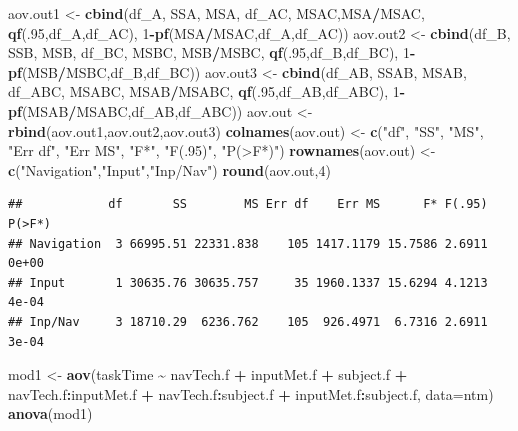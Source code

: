 \documentclass[
]{book}
\newenvironment{Shaded}{\begin{snugshade}}{\end{snugshade}}
\newcommand{\AttributeTok}[1]{\textcolor[rgb]{0.13,0.29,0.53}{#1}}
\newcommand{\DecValTok}[1]{\textcolor[rgb]{0.00,0.00,0.81}{#1}}
\newcommand{\FunctionTok}[1]{\textcolor[rgb]{0.13,0.29,0.53}{\textbf{#1}}}
\newcommand{\NormalTok}[1]{#1}
\newcommand{\OtherTok}[1]{\textcolor[rgb]{0.56,0.35,0.01}{#1}}
\newcommand{\SpecialCharTok}[1]{\textcolor[rgb]{0.81,0.36,0.00}{\textbf{#1}}}
\newcommand{\StringTok}[1]{\textcolor[rgb]{0.31,0.60,0.02}{#1}}
\begin{document}
\begin{Shaded}
\begin{Highlighting}[]
\NormalTok{aov.out1 }\OtherTok{\textless{}{-}} \FunctionTok{cbind}\NormalTok{(df\_A, SSA, MSA, df\_AC, MSAC,MSA}\SpecialCharTok{/}\NormalTok{MSAC, }\FunctionTok{qf}\NormalTok{(.}\DecValTok{95}\NormalTok{,df\_A,df\_AC),}
                  \DecValTok{1}\SpecialCharTok{{-}}\FunctionTok{pf}\NormalTok{(MSA}\SpecialCharTok{/}\NormalTok{MSAC,df\_A,df\_AC))}
\NormalTok{aov.out2 }\OtherTok{\textless{}{-}} \FunctionTok{cbind}\NormalTok{(df\_B, SSB, MSB, df\_BC, MSBC, MSB}\SpecialCharTok{/}\NormalTok{MSBC, }\FunctionTok{qf}\NormalTok{(.}\DecValTok{95}\NormalTok{,df\_B,df\_BC),}
                  \DecValTok{1}\SpecialCharTok{{-}}\FunctionTok{pf}\NormalTok{(MSB}\SpecialCharTok{/}\NormalTok{MSBC,df\_B,df\_BC))}
\NormalTok{aov.out3 }\OtherTok{\textless{}{-}} \FunctionTok{cbind}\NormalTok{(df\_AB, SSAB, MSAB, df\_ABC, MSABC, MSAB}\SpecialCharTok{/}\NormalTok{MSABC, }\FunctionTok{qf}\NormalTok{(.}\DecValTok{95}\NormalTok{,df\_AB,df\_ABC),}
                  \DecValTok{1}\SpecialCharTok{{-}}\FunctionTok{pf}\NormalTok{(MSAB}\SpecialCharTok{/}\NormalTok{MSABC,df\_AB,df\_ABC))}
\NormalTok{aov.out }\OtherTok{\textless{}{-}} \FunctionTok{rbind}\NormalTok{(aov.out1,aov.out2,aov.out3)}
\FunctionTok{colnames}\NormalTok{(aov.out) }\OtherTok{\textless{}{-}} \FunctionTok{c}\NormalTok{(}\StringTok{"df"}\NormalTok{, }\StringTok{"SS"}\NormalTok{, }\StringTok{"MS"}\NormalTok{, }\StringTok{"Err df"}\NormalTok{, }\StringTok{"Err MS"}\NormalTok{, }\StringTok{"F*"}\NormalTok{,}
                       \StringTok{"F(.95)"}\NormalTok{, }\StringTok{"P(\textgreater{}F*)"}\NormalTok{)}
\FunctionTok{rownames}\NormalTok{(aov.out) }\OtherTok{\textless{}{-}} \FunctionTok{c}\NormalTok{(}\StringTok{"Navigation"}\NormalTok{,}\StringTok{"Input"}\NormalTok{,}\StringTok{"Inp/Nav"}\NormalTok{)}
\FunctionTok{round}\NormalTok{(aov.out,}\DecValTok{4}\NormalTok{)}
\end{Highlighting}
\end{Shaded}

\begin{verbatim}
##            df       SS        MS Err df    Err MS      F* F(.95) P(>F*)
## Navigation  3 66995.51 22331.838    105 1417.1179 15.7586 2.6911  0e+00
## Input       1 30635.76 30635.757     35 1960.1337 15.6294 4.1213  4e-04
## Inp/Nav     3 18710.29  6236.762    105  926.4971  6.7316 2.6911  3e-04
\end{verbatim}

\begin{Shaded}
\begin{Highlighting}[]
\NormalTok{mod1 }\OtherTok{\textless{}{-}} \FunctionTok{aov}\NormalTok{(taskTime }\SpecialCharTok{\textasciitilde{}}\NormalTok{ navTech.f }\SpecialCharTok{+}\NormalTok{ inputMet.f }\SpecialCharTok{+}\NormalTok{ subject.f }\SpecialCharTok{+}
\NormalTok{              navTech.f}\SpecialCharTok{:}\NormalTok{inputMet.f }\SpecialCharTok{+}\NormalTok{ navTech.f}\SpecialCharTok{:}\NormalTok{subject.f }\SpecialCharTok{+}
\NormalTok{              inputMet.f}\SpecialCharTok{:}\NormalTok{subject.f, }\AttributeTok{data=}\NormalTok{ntm)}
\FunctionTok{anova}\NormalTok{(mod1)}
\end{Highlighting}
\end{Shaded}
\end{document}

